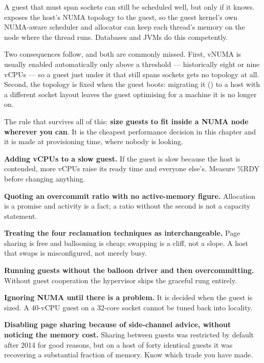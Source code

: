 \begin{conceptbox}
A guest that must span sockets can still be scheduled well, but only if it
knows.  exposes the host's NUMA topology to the guest, so the guest
kernel's own NUMA-aware scheduler and allocator can keep each thread's memory
on the node where the thread runs. Databases and JVMs do this competently.

\smallskip
Two consequences follow, and both are commonly missed. First, vNUMA is usually
enabled automatically only above a threshold --- historically eight or nine
vCPUs --- so a guest just under it that still spans sockets gets no topology at
all. Second, the topology is fixed when the guest boots: migrating it
() to a host with a different socket layout leaves the guest
optimising for a machine it is no longer on.

\smallskip
The rule that survives all of this: \textbf{size guests to fit inside a NUMA
node wherever you can}. It is the cheapest performance decision in this chapter
and it is made at provisioning time, where nobody is looking.
\end{conceptbox}

\begin{pitfall}
\begin{tight}
  \item \textbf{Adding vCPUs to a slow guest.} If the guest is slow because the
        host is contended, more vCPUs raise its ready time and everyone
        else's. Measure \%RDY before changing anything.
  \item \textbf{Quoting an overcommit ratio with no active-memory figure.}
        Allocation is a promise and activity is a fact; a ratio without the
        second is not a capacity statement.
  \item \textbf{Treating the four reclamation techniques as interchangeable.}
        Page sharing is free and ballooning is cheap; swapping is a cliff,
        not a slope. A host that swaps is misconfigured, not merely busy.
  \item \textbf{Running guests without the balloon driver and then
        overcommitting.} Without guest cooperation the hypervisor skips the
        graceful rung entirely.
  \item \textbf{Ignoring NUMA until there is a problem.} It is decided when the
        guest is sized. A 40-vCPU guest on a 32-core socket cannot be tuned
        back into locality.
  \item \textbf{Disabling page sharing because of side-channel advice, without
        noticing the memory cost.} Sharing between guests was restricted by
        default after 2014 for good reasons, but on a host of forty identical
        guests it was recovering a substantial fraction of memory. Know which
        trade you have made.
\end{tight}
\end{pitfall}


